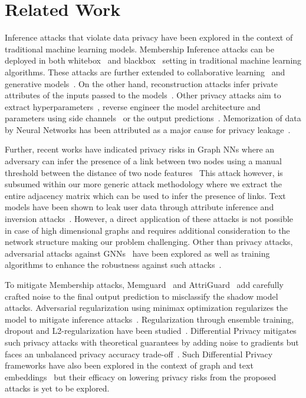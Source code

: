 \section{Related Work}\label{related}


Inference attacks that violate data privacy have been explored in the context of traditional machine learning models.
Membership Inference attacks can be deployed in both whitebox~\cite{whitebox} and blackbox~\cite{membershipinf} setting in traditional machine learning algorithms.
These attacks are further extended to collaborative learning~\cite{collabinf,whitebox} and generative models~\cite{logan}.
On the other hand, reconstruction attacks infer private attributes of the inputs passed to the models~\cite{attributeinf, attributeinf2, propertyinf, modelinversion}.
Other privacy attacks aim to extract hyperparameters~\cite{8418595}, reverse engineer the model architecture and parameters using side channels~\cite{timing} or the output predictions~\cite{stealml}.
Memorization of data by Neural Networks has been attributed as a major cause for privacy leakage~\cite{memorize,secretsharer,overlearninginf}.

Further, recent works have indicated privacy risks in Graph NNs where an adversary can infer the presence of a link between two nodes using a manual threshold between the distance of two node features~\cite{linksteal}
This attack however, is subsumed within our more generic attack methodology where we extract the entire adjacency matrix which can be used to infer the presence of links.
Text models have been shown to leak user data through attribute inference and inversion attacks~\cite{textembleak,nlp}. 
However, a direct application of these attacks is not possible in case of high dimensional graphs and requires additional consideration to the network structure making our problem challenging.
Other than privacy attacks, adversarial attacks against GNNs~\cite{graphatt,nodepoison} have been explored as well as training algorithms to enhance the robustness against such attacks~\cite{robustdef1,robustdef2}.

To mitigate Membership attacks, Memguard~\cite{memguard} and AttriGuard~\cite{attriguard} add carefully crafted noise to the final output prediction to misclassify the shadow model attacks.
Adversarial regularization using minimax optimization regularizes the model to mitigate inference attacks~\cite{advreg}.
Regularization through ensemble training, dropout and L2-regularization have been studied~\cite{ndss19salem}.
Differential Privacy mitigates such privacy attacks with theoretical guarantees by adding noise to gradients but faces an unbalanced privacy accuracy trade-off~\cite{diffpriv}.
Such Differential Privacy frameworks have also been explored in the context of graph and text embeddings~\cite{dptext,dpne} but their efficacy on lowering privacy risks from the proposed attacks is yet to be explored.
